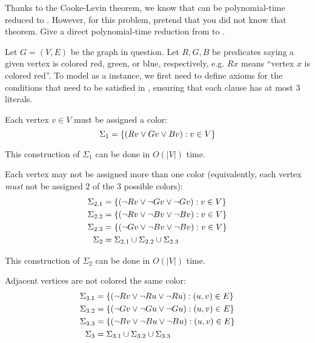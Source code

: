 \begin{problem}
  Thanks to the Cooke-Levin theorem, we know that
  \TColor can be polynomial-time reduced to \TSAT.
  However, for this problem, pretend that you did not know that theorem.
  Give a direct polynomial-time reduction from \TColor to \TSAT.
\end{problem}
\begin{Answer}
  Let $G = (V, E)$ be the graph in question.
  Let $R, G, B$ be predicates saying a given vertex is colored red, green,
  or blue, respectively, e.g. $Rx$ means ``vertex $x$ is colored red''.
  To model \TColor as a \TSAT instance, we first need to define axioms
  for the conditions that need to be satisfied in \TColor,
  ensuring that each clause has at most $3$ literals.

  \begin{enumroman}
    \item Each vertex $v \in V$ must be assigned a color:
      \[
        \Sigma_1 = \left\{ (Rv \lor Gv \lor Bv) : v \in V \right\}
      \]

      \step
      This construction of $\Sigma_1$ can be done in $O(|V|)$ time.

    \item Each vertex may not be assigned more than one color
      (equivalently, each vertex \emph{must} not be assigned
      $2$ of the $3$ possible colors):
      \begin{align*}
        \Sigma_{2.1} &= \left\{ (\neg Rv \lor \neg Gv \lor \neg Gv) : v \in V \right\} \\
        \Sigma_{2.2} &= \left\{ (\neg Rv \lor \neg Bv \lor \neg Bv) : v \in V \right\} \\
        \Sigma_{2.3} &= \left\{ (\neg Gv \lor \neg Bv \lor \neg Bv) : v \in V \right\} \\
        \Sigma_2 &= \Sigma_{2.1} \cup \Sigma_{2.2} \cup \Sigma_{2.3}
      \end{align*}

      \step
      This construction of $\Sigma_2$ can be done in $O(|V|)$ time.
    \item Adjacent vertices are not colored the same color:
      \begin{align*}
        \Sigma_{3.1} &= \left\{ (\neg Rv \lor \neg Ru \lor \neg Ru) : (u, v) \in E \right\} \\
        \Sigma_{3.2} &= \left\{ (\neg Gv \lor \neg Gu \lor \neg Gu) : (u, v) \in E \right\} \\
        \Sigma_{3.3} &= \left\{ (\neg Bv \lor \neg Bu \lor \neg Bu) : (u, v) \in E \right\} \\
        \Sigma_3 &= \Sigma_{3.1} \cup \Sigma_{3.2} \cup \Sigma_{3.3}
      \end{align*}


\end{enumroman}
\end{Answer}

